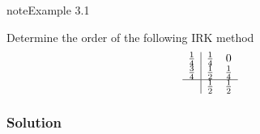 \documentclass[letterpaper,10pt,english]{jupyterBook}
\begin{document}
\begin{sphinxadmonition}{note}{Example 3.1}

\sphinxAtStartPar
Determine the order of the following IRK method
\begin{align*}
    \begin{array}{c|cc}
          \frac{1}{4} & \frac{1}{4} & 0 \\
          \frac{3}{4} & \frac{1}{2} & \frac{1}{4} \\ \hline
          & \frac{1}{2} & \frac{1}{2}
    \end{array}
\end{align*}\subsubsection*{Solution}


\end{sphinxadmonition}
\end{document}
